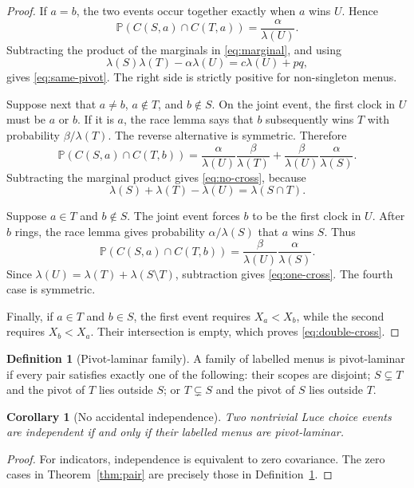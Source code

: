 \documentclass[11pt]{article}
\newtheorem{corollary}[theorem]{Corollary}
\theoremstyle{definition}
\newtheorem{definition}[theorem]{Definition}
\newcommand{\Pp}{\mathbb{P}}
\newcommand{\1}{\mathbf{1}}
\begin{document}
\begin{proof}
If \(a=b\), the two events occur together exactly when \(a\) wins \(U\). Hence
\[
\Pp(C(S,a)\cap C(T,a))=\frac{\alpha}{\lambda(U)}.
\]
Subtracting the product of the marginals in \eqref{eq:marginal}, and using
\[
\lambda(S)\lambda(T)-\alpha\lambda(U)=c\lambda(U)+pq,
\]
gives \eqref{eq:same-pivot}. The right side is strictly positive for non-singleton menus.

Suppose next that \(a\ne b\), \(a\notin T\), and \(b\notin S\). On the joint event, the first clock
in \(U\) must be \(a\) or \(b\). If it is \(a\), the race lemma says that \(b\) subsequently wins
\(T\) with probability \(\beta/\lambda(T)\). The reverse alternative is symmetric. Therefore
\[
\Pp(C(S,a)\cap C(T,b))
=\frac{\alpha}{\lambda(U)}\frac{\beta}{\lambda(T)}
 +\frac{\beta}{\lambda(U)}\frac{\alpha}{\lambda(S)}.
\]
Subtracting the marginal product gives \eqref{eq:no-cross}, because
\[
\lambda(S)+\lambda(T)-\lambda(U)=\lambda(S\cap T).
\]

Suppose \(a\in T\) and \(b\notin S\). The joint event forces \(b\) to be the first clock in \(U\).
After \(b\) rings, the race lemma gives probability \(\alpha/\lambda(S)\) that \(a\) wins \(S\).
Thus
\[
\Pp(C(S,a)\cap C(T,b))
=\frac{\beta}{\lambda(U)}\frac{\alpha}{\lambda(S)}.
\]
Since \(\lambda(U)=\lambda(T)+\lambda(S\setminus T)\), subtraction gives
\eqref{eq:one-cross}. The fourth case is symmetric.

Finally, if \(a\in T\) and \(b\in S\), the first event requires \(X_a<X_b\), while the second
requires \(X_b<X_a\). Their intersection is empty, which proves \eqref{eq:double-cross}.
\end{proof}

\begin{definition}[Pivot-laminar family]
\label{def:pivot-laminar}
A family of labelled menus is pivot-laminar if every pair satisfies exactly one of the following:
their scopes are disjoint; \(S\subsetneq T\) and the pivot of \(T\) lies outside \(S\); or
\(T\subsetneq S\) and the pivot of \(S\) lies outside \(T\).
\end{definition}

\begin{corollary}[No accidental independence]
\label{cor:pair}
Two nontrivial Luce choice events are independent if and only if their labelled menus are
pivot-laminar.
\end{corollary}

\begin{proof}
For indicators, independence is equivalent to zero covariance. The zero cases in
Theorem~\ref{thm:pair} are precisely those in Definition~\ref{def:pivot-laminar}.
\end{proof}
\end{document}
